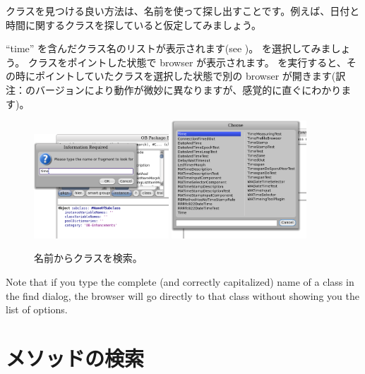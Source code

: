 \documentclass[a4paper,10pt,twoside]{book}
\begin{document}
{クラスを見つける良い方法は、名前を使って探し出すことです。例えば、日付と時間に関するクラスを探していると仮定してみましょう。

\noindent
``time'' を含んだクラス名のリストが表示されます(see )。 を選択してみましょう。 クラスをポイントした状態で browser が表示されます。 を実行すると、その時にポイントしていたクラスを選択した状態で別の browser が開きます(訳注：\pharo のバージョンにより動作が微妙に異なりますが、感覚的に直ぐにわかります)。

\begin{figure}[hbt]
\centerline{
	\includegraphics[width=0.45\textwidth]{FindIt}
	\hspace{1cm}
	\includegraphics[width=0.45\textwidth]{TimeClasses}
}
\caption{名前からクラスを検索。
}
\end{figure}

Note that if you type the complete (and correctly capitalized) name of a class in the find dialog, the browser will go directly to that class without showing you the list of options.

\section{メソッドの検索}

}
\end{document}
